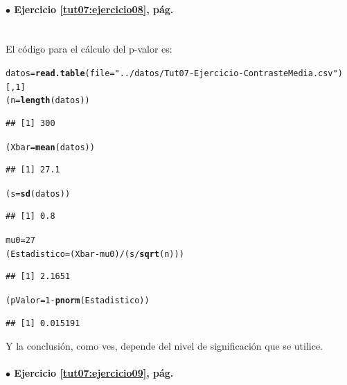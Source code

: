 \documentclass[10pt,a4paper]{article}\usepackage[]{graphicx}\usepackage[]{color}
\makeatletter
\newcommand{\hlnum}[1]{\textcolor[rgb]{0.686,0.059,0.569}{#1}}%
\newcommand{\hlstr}[1]{\textcolor[rgb]{0.192,0.494,0.8}{#1}}%
\newcommand{\hlopt}[1]{\textcolor[rgb]{0,0,0}{#1}}%
\newcommand{\hlstd}[1]{\textcolor[rgb]{0.345,0.345,0.345}{#1}}%
\newcommand{\hlkwb}[1]{\textcolor[rgb]{0.69,0.353,0.396}{#1}}%
\newcommand{\hlkwc}[1]{\textcolor[rgb]{0.333,0.667,0.333}{#1}}%
\newcommand{\hlkwd}[1]{\textcolor[rgb]{0.737,0.353,0.396}{\textbf{#1}}}%
\newenvironment{kframe}{%
 \def\at@end@of@kframe{}%
 \ifinner\ifhmode%
  \def\at@end@of@kframe{\end{minipage}}%
  \begin{minipage}{\columnwidth}%
 \fi\fi%
 \def\FrameCommand##1{\hskip\@totalleftmargin \hskip-\fboxsep
 \colorbox{shadecolor}{##1}\hskip-\fboxsep
     \hskip-\linewidth \hskip-\@totalleftmargin \hskip\columnwidth}%
 \MakeFramed {\advance\hsize-\width
   \@totalleftmargin\z@ \linewidth\hsize
   \@setminipage}}%
 {\par\unskip\endMakeFramed%
 \at@end@of@kframe}
\newenvironment{knitrout}{}{} %
\makeatother
\begin{document}
\paragraph{\bf $\bullet$ Ejercicio \ref{tut07:ejercicio08}, pág. \pageref{tut07:ejercicio08}}
\label{tut07:ejercicio08:sol}\quad\\

El código para el cálculo del p-valor es:
\begin{knitrout}
\color{fgcolor}\begin{kframe}
\begin{alltt}
\hlstd{datos} \hlkwb{=} \hlkwd{read.table}\hlstd{(}\hlkwc{file} \hlstd{=} \hlstr{"../datos/Tut07-Ejercicio-ContrasteMedia.csv"}\hlstd{)[ ,}\hlnum{1}\hlstd{]}
\hlstd{(n} \hlkwb{=} \hlkwd{length}\hlstd{(datos))}
\end{alltt}
\begin{verbatim}
## [1] 300
\end{verbatim}
\begin{alltt}
\hlstd{(Xbar} \hlkwb{=} \hlkwd{mean}\hlstd{(datos))}
\end{alltt}
\begin{verbatim}
## [1] 27.1
\end{verbatim}
\begin{alltt}
\hlstd{(s} \hlkwb{=} \hlkwd{sd}\hlstd{(datos))}
\end{alltt}
\begin{verbatim}
## [1] 0.8
\end{verbatim}
\begin{alltt}
\hlstd{mu0} \hlkwb{=} \hlnum{27}
\hlstd{(Estadistico} \hlkwb{=} \hlstd{(Xbar} \hlopt{-} \hlstd{mu0)} \hlopt{/} \hlstd{(s} \hlopt{/} \hlkwd{sqrt}\hlstd{(n)))}
\end{alltt}
\begin{verbatim}
## [1] 2.1651
\end{verbatim}
\begin{alltt}
\hlstd{(pValor} \hlkwb{=} \hlnum{1} \hlopt{-} \hlkwd{pnorm}\hlstd{(Estadistico))}
\end{alltt}
\begin{verbatim}
## [1] 0.015191
\end{verbatim}
\end{kframe}
\end{knitrout}
Y la conclusión, como ves, depende del nivel de significación que se utilice.

\paragraph{\bf $\bullet$ Ejercicio \ref{tut07:ejercicio09}, pág. \pageref{tut07:ejercicio09}}
\label{tut07:ejercicio09:sol}\quad\\
\end{document}

